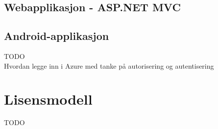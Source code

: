 \subsection{Webapplikasjon - ASP.NET MVC}
\label{subsec:konfigurasjon_implementeringMotDeUlikePlatformene_Webapplikasjon}

\subsection{Android-applikasjon}
\label{subsec:konfigurasjon_implementeringMotDeUlikePlatformene_leggetilNyApplikasjon_androidApplikasjon}
{\color{red}TODO} \\
Hvordan legge inn i Azure med tanke på autorisering og autentisering

\section{Lisensmodell}
\label{sec:konfigurasjon_lisensmodell}
{\color{red}TODO} \\